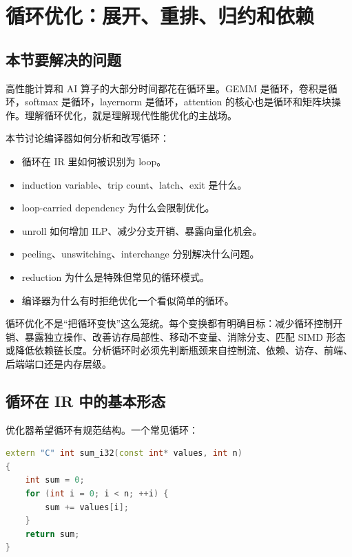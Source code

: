 \section{循环优化：展开、重排、归约和依赖}

\subsection{本节要解决的问题}

高性能计算和 AI 算子的大部分时间都花在循环里。GEMM 是循环，卷积是循环，softmax 是循环，layernorm 是循环，attention 的核心也是循环和矩阵块操作。理解循环优化，就是理解现代性能优化的主战场。

本节讨论编译器如何分析和改写循环：

\begin{itemize}
  \item 循环在 IR 里如何被识别为 loop。
  \item induction variable、trip count、latch、exit 是什么。
  \item loop-carried dependency 为什么会限制优化。
  \item unroll 如何增加 ILP、减少分支开销、暴露向量化机会。
  \item peeling、unswitching、interchange 分别解决什么问题。
  \item reduction 为什么是特殊但常见的循环模式。
  \item 编译器为什么有时拒绝优化一个看似简单的循环。
\end{itemize}

\begin{keyidea}
循环优化不是“把循环变快”这么笼统。每个变换都有明确目标：减少循环控制开销、暴露独立操作、改善访存局部性、移动不变量、消除分支、匹配 SIMD 形态或降低依赖链长度。分析循环时必须先判断瓶颈来自控制流、依赖、访存、前端、后端端口还是内存层级。
\end{keyidea}

\subsection{循环在 IR 中的基本形态}

优化器希望循环有规范结构。一个常见循环：

\begin{lstlisting}[language=C++]
extern "C" int sum_i32(const int* values, int n)
{
    int sum = 0;
    for (int i = 0; i < n; ++i) {
        sum += values[i];
    }
    return sum;
}
\end{lstlisting}

